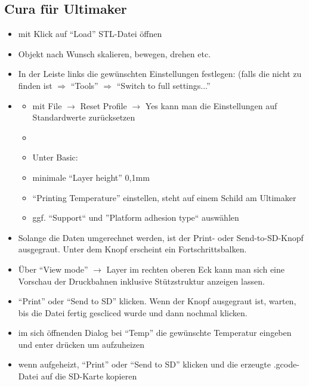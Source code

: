 \documentclass{\basedir/fablab-document}
\begin{document}
\subsection{Cura für Ultimaker}
\begin{itemize}
\item mit Klick auf ``Load'' STL-Datei öffnen
\item Objekt nach Wunsch skalieren, bewegen, drehen etc.
\item In der Leiste links die gewünschten Einstellungen festlegen: (falls die nicht zu finden ist $\Rightarrow$ ``Tools'' $\Rightarrow$ ``Switch to full settings...''
\item {}
 \begin{itemize}
  \item mit File $\rightarrow$ Reset Profile $\rightarrow$ Yes kann man die Einstellungen auf Standardwerte zurücksetzen
  \item {}
  \item Unter Basic:
  \item minimale ``Layer height'' 0,1mm
  \item ``Printing Temperature'' einstellen, steht auf einem Schild am Ultimaker
  \item ggf. ``Support`` und ''Platform adhesion type`` auswählen
 \end{itemize}
\item Solange die Daten umgerechnet werden, ist der Print- oder Send-to-SD-Knopf ausgegraut. Unter dem Knopf erscheint ein Fortschrittsbalken.
\item Über \enquote{View mode} $\rightarrow$ Layer im rechten oberen Eck kann man sich eine Vorschau der Druckbahnen inklusive Stützstruktur anzeigen lassen.
\item ``Print'' oder ``Send to SD'' klicken. Wenn der Knopf ausgegraut ist, warten, bis die Datei fertig gescliced wurde und dann nochmal klicken.
\item im sich öffnenden Dialog bei ``Temp'' die gewünschte Temperatur eingeben und enter drücken um aufzuheizen
\item wenn aufgeheizt, ``Print'' oder ``Send to SD'' klicken und die erzeugte .gcode-Datei auf die SD-Karte kopieren
\end{itemize}
\end{document}
